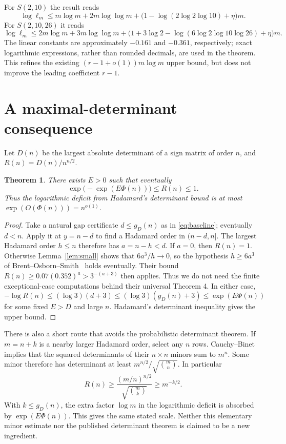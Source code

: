 \documentclass[11pt]{article}
\newtheorem{theorem}{Theorem}[section]
\newcommand{\ph}{\Phi}
\begin{document}
For $S(2,10)$ the result reads
\[
\log\ell_m\le m\log m+2m\log\log m+
\bigl(1-\log(2\log2\log10)+\eta\bigr)m.
\]
For $S(2,10,26)$ it reads
\[
\log\ell_m\le2m\log m+3m\log\log m+
\bigl(1+3\log2-\log(6\log2\log10\log26)+\eta\bigr)m.
\]
The linear constants are approximately $-0.161$ and $-0.361$,
respectively; exact logarithmic expressions, rather than rounded decimals,
are used in the theorem. This refines the existing $(r-1+o(1))m\log m$
upper bound, but does not improve the leading coefficient $r-1$.

\section{A maximal-determinant consequence}
Let $D(n)$ be the largest absolute determinant of a sign matrix of order
$n$, and $R(n)=D(n)/n^{n/2}$.

\begin{theorem}\label{thm:det}
There exists $E>0$ such that eventually
\[
\exp\bigl(-\exp(E\ph(n))\bigr)\le R(n)\le1.
\]
Thus the logarithmic deficit from Hadamard's determinant bound is at most
$\exp(O(\ph(n)))=n^{o(1)}$.
\end{theorem}
\begin{proof}
Take a natural gap certificate $d\le g_D(n)$ as in
\eqref{eq:baseline}; eventually $d<n$. Apply it at $y=n-d$ to find a
Hadamard order in $(n-d,n]$. The largest Hadamard order $h\le n$ therefore
has $a=n-h<d$. If $a=0$, then $R(n)=1$. Otherwise Lemma~\ref{lem:small}
shows that $6a^3/h\to0$, so the hypothesis $h\ge6a^3$ of
Brent--Osborn--Smith~\cite[Theorem 3]{BOS} holds eventually. Their bound
$R(n)\ge0.07(0.352)^a>3^{-(a+3)}$ then applies. Thus we do not need
the finite exceptional-case computations behind their universal Theorem 4.
In either case,
\[
-\log R(n)\le(\log3)(d+3)\le(\log3)(g_D(n)+3)
\le\exp(E\ph(n))
\]
for some fixed $E>D$ and large $n$. Hadamard's determinant inequality
gives the upper bound.
\end{proof}

There is also a short route that avoids the probabilistic determinant
theorem. If $m=n+k$ is a nearby larger Hadamard order, select any $n$
rows. Cauchy--Binet implies that the squared determinants of their
$n\times n$ minors sum to $m^n$. Some minor therefore has determinant
at least $m^{n/2}/\sqrt{\binom{m}{n}}$. In particular
\[
R(n)\ge\frac{(m/n)^{n/2}}{\sqrt{\binom{m}{k}}}
\ge m^{-k/2}.
\]
With $k\le g_D(n)$, the extra factor $\log m$ in the logarithmic
deficit is absorbed by $\exp(E\ph(n))$. This gives the same stated
scale. Neither this elementary minor estimate nor the published
determinant theorem is claimed to be a new ingredient.
\end{document}
